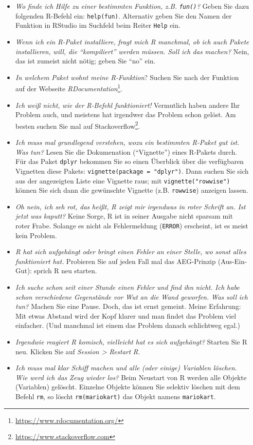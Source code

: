 \documentclass[
  letterpaper,
]{scrbook}
\providecommand{\tightlist}{%
  \setlength{\itemsep}{0pt}\setlength{\parskip}{0pt}}\usepackage{longtable,booktabs,array}
\theoremstyle{definition}
\theoremstyle{definition}
\theoremstyle{definition}
\theoremstyle{remark}
\begin{document}
\begin{itemize}
\tightlist
\item
  \emph{Wo finde ich Hilfe zu einer bestimmten Funktion, z.B.
  \texttt{fun()}?} Geben Sie dazu folgenden R-Befehl ein:
  \texttt{help(fun)}. Alternativ geben Sie den Namen der Funktion in
  RStudio im Suchfeld beim Reiter \texttt{Help} ein.
\item
  \emph{Wenn ich ein R-Paket installiere, fragt mich R manchmal, ob ich
  auch Pakete installieren, will, die ``kompiliert'' werden müssen. Soll
  ich das machen?} Nein, das ist zumeist nicht nötig; geben Sie ``no''
  ein.
\item
  \emph{In welchem Paket wohnt meine R-Funktion}? Suchen Sie nach der
  Funktion auf der Webseite \emph{RDocumentation}\footnote{\url{https://www.rdocumentation.org/}}.
\item
  \emph{Ich weiß nicht, wie der R-Befehl funktioniert!} Vermutlich haben
  andere Ihr Problem auch, und meistens hat irgendwer das Problem schon
  gelöst. Am besten suchen Sie mal auf Stackoverflow\footnote{\url{https://www.stackoverflow.com}}.
\item
  \emph{Ich muss mal grundlegend verstehen, wozu ein bestimmten R-Paket
  gut ist. Was tun?} Lesen Sie die Dokumenation (``Vignette'') eines
  R-Pakets durch. Für das Paket \texttt{dplyr} bekommen Sie so einen
  Überblick über die verfügbaren Vignetten diese Pakets:
  \texttt{vignette(package\ =\ "dplyr")}. Dann suchen Sie sich aus der
  angezeigten Liste eine Vignette raus; mit \texttt{vignette("rowwise")}
  können Sie sich dann die gewünschte Vignette (z.B. \texttt{rowwise})
  anzeigen lassen.
\item
  \emph{Oh nein, ich seh rot, das heißt, R zeigt mir irgendwas in roter
  Schrift an. Ist jetzt was kaputt?} Keine Sorge, R ist in seiner
  Ausgabe nicht sparsam mit roter Frabe. Solange es nicht als
  Fehlermeldung (\texttt{ERROR}) erscheint, ist es meist kein Problem.
\item
  \emph{R hat sich aufgehängt oder bringt einen Fehler an einer Stelle,
  wo sonst alles funktioniert hat.} Probieren Sie auf jeden Fall mal das
  AEG-Prinzip (Aus-Ein-Gut): sprich R neu starten.
\item
  \emph{Ich suche schon seit einer Stunde einen Fehler und find ihn
  nicht. Ich habe schon verschiedene Gegenstände vor Wut an die Wand
  geworfen. Was soll ich tun?} Machen Sie eine Pause. Doch, das ist
  ernst gemeint. Meine Erfahrung: Mit etwas Abstand wird der Kopf klarer
  und man findet das Problem viel einfacher. (Und manchmal ist einem das
  Problem danach schlichtweg egal.)
\item
  \emph{Irgendwie reagiert R komisch, vielleicht hat es sich
  aufgehängt?} Starten Sie R neu. Klicken Sie auf \emph{Session
  \textgreater{} Restart R}.
\item
  \emph{Ich muss mal klar Schiff machen und alle (oder einige) Variablen
  löschen. Wie werd ich das Zeug wieder los?} Beim Neustart von R werden
  alle Objekte (Variablen) gelöscht. Einzelne Objekte können Sie
  selektiv löschen mit dem Befehl \texttt{rm}, so löscht
  \texttt{rm(mariokart)} das Objekt namens \texttt{mariokart}.
\end{itemize}
\end{document}
